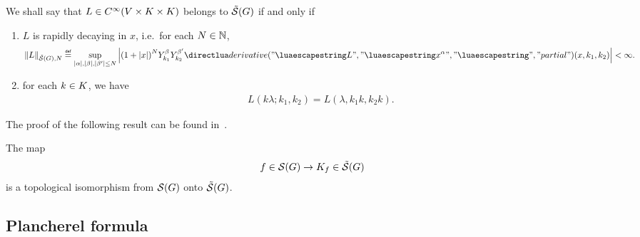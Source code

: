 \begin{definition}
    We shall say that $L \in {C^\infty(V\times K\times K)}$ belongs to $\tilde{\mathcal{S}}(G)$ if and only if
    \begin{enumerate}
        \item $L$ is rapidly decaying in $x$, i.e.\ for each $N \in \mathbb{N}$,
            \begin{align*}
                \seminorm[\ScalarImageSchwartz\Group]{N}{L}
                \defeq
                \sup_{\abs\alpha, \abs\beta, \abs{\beta'} \leq N}
                \abs{%
                    {(1 + \abs{x})}^N
                    \LeftDifferentialOperatorOnCompactGroup[k_1]{\beta}
                    \LeftDifferentialOperatorOnCompactGroup[k_2]{\beta'}
                    \D[L]{x^\alpha}(x, k_1, k_2)
                }
                < \infty.
            \end{align*}
        \item for each $k \in K$, we have
            \begin{align*}
                L(k \lambda; k_1, k_2) = L(\lambda, k_1 k, k_2 k).
            \end{align*}
    \end{enumerate}
\end{definition}

The proof of the following result can be found in~\cite{Kumahara76}.
\begin{proposition}
    The map
    \begin{align*}
        f \in {\mathcal{S} (G)} \to K_f \in \tilde{\mathcal{S}}(G)
    \end{align*}
    is a topological isomorphism from ${\mathcal{S} (G)}$ onto $\tilde{\mathcal{S}}(G)$.
\end{proposition}

\subsection{Plancherel formula}

